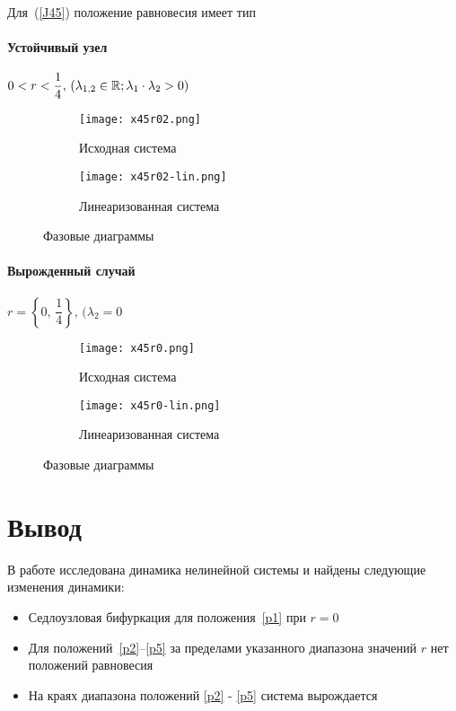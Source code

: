     Для~(\ref{J45}) положение равновесия имеет тип
    \paragraph*{Устойчивый узел} $0 < r < \dfrac{1}{4},\,(\lambda_{1, 2} \in \operatorname{\mathbb{R}}; \lambda_1\cdot\lambda_2 > 0)$\nopagebreak
    \begin{figure}[H]
        \begin{subfigure}{0.5\linewidth}
            \texttt{[image: x45r02.png]}
            \caption{Исходная система}
        \end{subfigure}
        \begin{subfigure}{0.5\linewidth}
            \texttt{[image: x45r02-lin.png]}
            \caption{Линеаризованная система}
        \end{subfigure}
        \caption{Фазовые диаграммы}
    \end{figure}

    \paragraph*{Вырожденный случай} $r = \left\{0,\, \dfrac{1}{4} \right\},\,(\lambda_2 = 0$\nopagebreak
    \begin{figure}[H]
        \begin{subfigure}{0.5\linewidth}
            \texttt{[image: x45r0.png]}
            \caption{Исходная система}
        \end{subfigure}
        \begin{subfigure}{0.5\linewidth}
            \texttt{[image: x45r0-lin.png]}
            \caption{Линеаризованная система}
        \end{subfigure}
        \caption{Фазовые диаграммы}
    \end{figure}

    \section*{Вывод}
    В работе исследована динамика нелинейной системы и найдены следующие изменения динамики:
    \begin{itemize}
        \item Седлоузловая бифуркация для положения~\eqref{p1} при $r = 0$
        \item Для положений~\eqref{p2}--\eqref{p5} за пределами указанного диапазона значений $r$ нет положений равновесия
        \item На краях диапазона положений \eqref{p2} - \eqref{p5} система вырождается
    \end{itemize}



